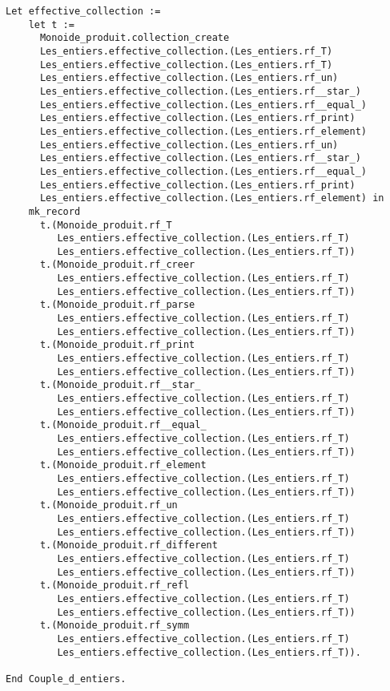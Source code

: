 {\begin{lstlisting}[language=MyCoq,title=\coq\ code for collections]
  Let effective_collection :=
    let t :=
      Monoide_produit.collection_create
      Les_entiers.effective_collection.(Les_entiers.rf_T)
      Les_entiers.effective_collection.(Les_entiers.rf_T)
      Les_entiers.effective_collection.(Les_entiers.rf_un)
      Les_entiers.effective_collection.(Les_entiers.rf__star_)
      Les_entiers.effective_collection.(Les_entiers.rf__equal_)
      Les_entiers.effective_collection.(Les_entiers.rf_print)
      Les_entiers.effective_collection.(Les_entiers.rf_element)
      Les_entiers.effective_collection.(Les_entiers.rf_un)
      Les_entiers.effective_collection.(Les_entiers.rf__star_)
      Les_entiers.effective_collection.(Les_entiers.rf__equal_)
      Les_entiers.effective_collection.(Les_entiers.rf_print)
      Les_entiers.effective_collection.(Les_entiers.rf_element) in 
    mk_record
      t.(Monoide_produit.rf_T
         Les_entiers.effective_collection.(Les_entiers.rf_T)
         Les_entiers.effective_collection.(Les_entiers.rf_T))
      t.(Monoide_produit.rf_creer
         Les_entiers.effective_collection.(Les_entiers.rf_T)
         Les_entiers.effective_collection.(Les_entiers.rf_T))
      t.(Monoide_produit.rf_parse
         Les_entiers.effective_collection.(Les_entiers.rf_T)
         Les_entiers.effective_collection.(Les_entiers.rf_T))
      t.(Monoide_produit.rf_print
         Les_entiers.effective_collection.(Les_entiers.rf_T)
         Les_entiers.effective_collection.(Les_entiers.rf_T))
      t.(Monoide_produit.rf__star_
         Les_entiers.effective_collection.(Les_entiers.rf_T)
         Les_entiers.effective_collection.(Les_entiers.rf_T))
      t.(Monoide_produit.rf__equal_
         Les_entiers.effective_collection.(Les_entiers.rf_T)
         Les_entiers.effective_collection.(Les_entiers.rf_T))
      t.(Monoide_produit.rf_element
         Les_entiers.effective_collection.(Les_entiers.rf_T)
         Les_entiers.effective_collection.(Les_entiers.rf_T))
      t.(Monoide_produit.rf_un
         Les_entiers.effective_collection.(Les_entiers.rf_T)
         Les_entiers.effective_collection.(Les_entiers.rf_T))
      t.(Monoide_produit.rf_different
         Les_entiers.effective_collection.(Les_entiers.rf_T)
         Les_entiers.effective_collection.(Les_entiers.rf_T))
      t.(Monoide_produit.rf_refl
         Les_entiers.effective_collection.(Les_entiers.rf_T)
         Les_entiers.effective_collection.(Les_entiers.rf_T))
      t.(Monoide_produit.rf_symm
         Les_entiers.effective_collection.(Les_entiers.rf_T)
         Les_entiers.effective_collection.(Les_entiers.rf_T)).
    
End Couple_d_entiers.
\end{lstlisting}
}


